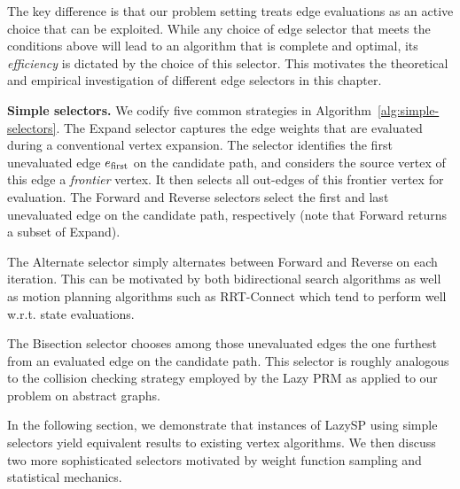 The key difference is that our problem setting treats 
edge evaluations as an active choice that can be exploited.
While any choice of edge selector that meets the conditions above
will lead to an algorithm that is complete and optimal,
its \emph{efficiency} is dictated by the choice of this
selector.
This motivates the theoretical and empirical investigation of different
edge selectors in this chapter.

\textbf{Simple selectors.}
We codify five common strategies in
Algorithm~\ref{alg:simple-selectors}.
The Expand selector captures the edge weights that are evaluated
during a conventional vertex expansion.
The selector identifies the first unevaluated edge
$e_{\mbox{\scriptsize first}}$ on the candidate path,
and considers the source vertex of this edge a \emph{frontier} vertex.
It then selects all out-edges of this frontier vertex
for evaluation.
The Forward and Reverse selectors select the first and last
unevaluated edge on the candidate path, respectively
(note that Forward returns a subset of Expand).

The Alternate selector simply alternates between Forward
and Reverse on each iteration.
This can be motivated by both bidirectional search algorithms
as well as motion planning algorithms such as
RRT-Connect \citep{kuffner2000rrtconnect}
which tend to perform well w.r.t. state evaluations.

The Bisection selector
chooses among those unevaluated edges
the one furthest from an evaluated edge on the candidate path.
This selector is roughly analogous to the collision checking strategy
employed by the Lazy PRM \citep{bohlin2000lazyprm}
as applied to our problem on abstract graphs.

In the following section,
we demonstrate that instances of LazySP using simple selectors
yield equivalent results to existing vertex algorithms.
We then discuss two more sophisticated
selectors motivated by weight function sampling
and statistical mechanics.

